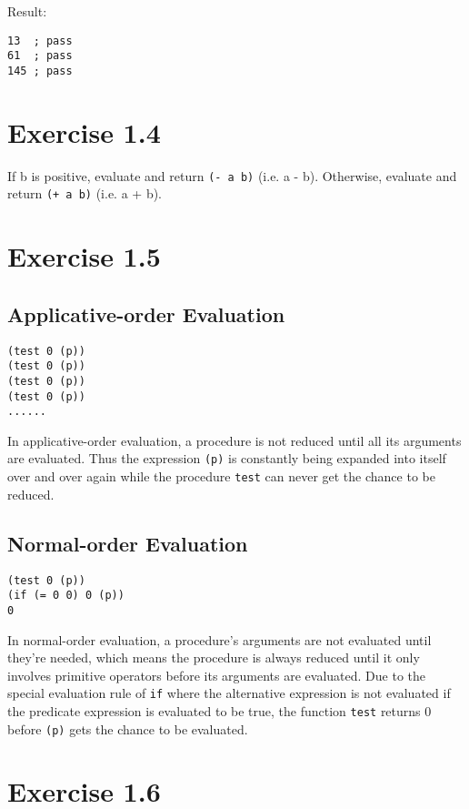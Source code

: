 \documentclass[../main.tex]{subfiles}
\begin{document}
Result:

\begin{lstlisting}
13  ; pass
61  ; pass
145 ; pass
\end{lstlisting}

\section{Exercise 1.4}

If b is positive, evaluate and return \lstinline{(- a b)} (i.e. a - b).
 Otherwise, evaluate and return \lstinline{(+ a b)} (i.e. a + b).

\section{Exercise 1.5}

\subsection*{Applicative-order Evaluation}

\begin{lstlisting}
(test 0 (p))
(test 0 (p))
(test 0 (p))
(test 0 (p))
......
\end{lstlisting}

In applicative-order evaluation, a procedure is not reduced until
 all its arguments are evaluated. Thus the expression \lstinline{(p)}
  is constantly being expanded into itself over and over again while
   the procedure \lstinline{test} can never get the chance to be reduced.

\subsection*{Normal-order Evaluation}

\begin{lstlisting}
(test 0 (p))
(if (= 0 0) 0 (p))
0
\end{lstlisting}

In normal-order evaluation, a procedure's arguments are not evaluated
 until they're needed, which means the procedure is always reduced
 until it only involves primitive operators before its arguments are
 evaluated. Due to the special evaluation rule of \lstinline{if}
 where the alternative expression is not evaluated if the predicate
 expression is evaluated to be true, the function \lstinline{test}
 returns 0 before \lstinline{(p)} gets the chance to be evaluated.

\section{Exercise 1.6}
\end{document}
